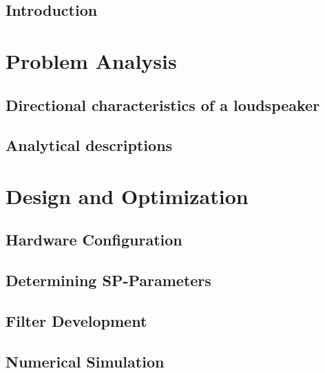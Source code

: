 \glsresetall
 \graphicspath{{figures/analysing/}}
\chapter{Introduction}\label{ch:intro}

\part{Problem Analysis}\label{pt:analysis} \glsresetall
 \graphicspath{{figures/analysing/}}
	\chapter{Directional characteristics of a loudspeaker}\label{ch:directional}
		
		
	\chapter{Analytical descriptions}\label{ch:analytical}
		
		
		
		

	



\part{Design and Optimization}\label{pt:design} 
\graphicspath{{figures/design/}}
	\chapter{Hardware Configuration}
	\chapter{Determining SP-Parameters}\label{ch:optimization}
		 		
	\chapter{Filter Development}
	
	\chapter{Numerical Simulation}\label{ch:numerical} 
	  
		 


